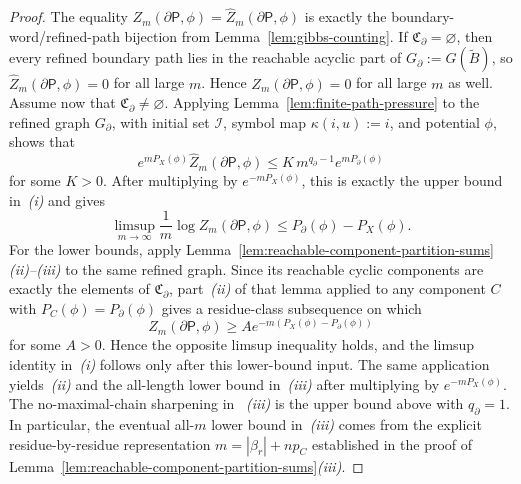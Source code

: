 \documentclass{etds}%
\numberwithin{equation}{section}
\theoremstyle{plain}
\theoremstyle{definition}
\theoremstyle{remark}
\begin{document}
\begin{proof}
The equality
$Z_m(\partial\mathsf{P},\phi)=\widehat Z_m(\partial\mathsf{P},\phi)$ is exactly
the boundary-word/refined-path bijection from Lemma~\ref{lem:gibbs-counting}.
If $\mathfrak{C}_\partial=\varnothing$, then every refined boundary path lies
in the reachable acyclic part of $G_\partial:=G(\widetilde{B})$, so
$\widehat Z_m(\partial\mathsf{P},\phi)=0$ for all large $m$.  Hence
$Z_m(\partial\mathsf{P},\phi)=0$ for all large $m$ as well.  Assume now that
$\mathfrak{C}_\partial\neq\varnothing$.  Applying
Lemma~\ref{lem:finite-path-pressure} to the refined graph $G_\partial$, with
initial set $\mathcal{I}$, symbol map $\kappa(i,u):=i$, and potential $\phi$,
shows that
\[
e^{mP_X(\phi)}\widehat Z_m(\partial\mathsf{P},\phi)
\le K\,m^{q_\partial-1}e^{mP_\partial(\phi)}
\]
for some $K>0$.  After multiplying by $e^{-mP_X(\phi)}$, this is exactly the
upper bound in~\emph{(i)} and gives
\[
\limsup_{m\to\infty}\frac1m\log Z_m(\partial\mathsf{P},\phi)
\le P_\partial(\phi)-P_X(\phi).
\]
For the lower bounds, apply
Lemma~\ref{lem:reachable-component-partition-sums}\emph{(ii)--(iii)} to the
same refined graph.  Since its reachable cyclic components are exactly the
elements of $\mathfrak{C}_\partial$, part~\emph{(ii)} of that lemma applied to
any component $C$ with $P_C(\phi)=P_\partial(\phi)$ gives a residue-class
subsequence on which
\[
Z_m(\partial\mathsf{P},\phi)
\ge A e^{-m(P_X(\phi)-P_\partial(\phi))}
\]
for some $A>0$.  Hence the opposite limsup inequality holds, and the limsup
identity in~\emph{(i)} follows only after this lower-bound input.  The same
application yields~\emph{(ii)} and the all-length lower bound in~\emph{(iii)}
after multiplying by $e^{-mP_X(\phi)}$.  The no-maximal-chain sharpening in
~\emph{(iii)} is the upper bound above with $q_\partial=1$.  In particular,
the eventual all-$m$ lower bound in~\emph{(iii)} comes from the explicit
residue-by-residue representation $m=|\beta_r|+np_C$ established in the proof
of Lemma~\ref{lem:reachable-component-partition-sums}\emph{(iii)}.
\end{proof}
\end{document}
